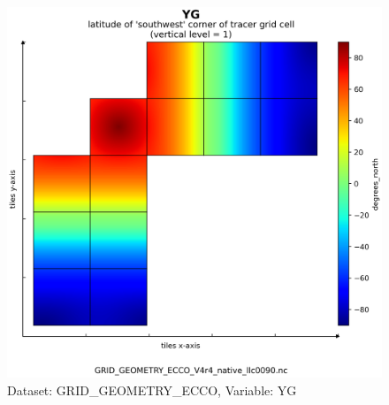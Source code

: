 \begin{figure}[H]
\centering
\includegraphics[scale=0.55]{../images/plots/v4r4/native_plots_coords/Geometry_Parameters_for_the_Lat-Lon-Cap_90_(llc90)_Native_Model_Grid_(Version_4_Release_4)/YG.png}
\caption{Dataset: GRID\_GEOMETRY\_ECCO, Variable: YG}
\label{tab:table-GRID_GEOMETRY_ECCO_YG-Plot}
\end{figure}
\newpage
\pagebreak
